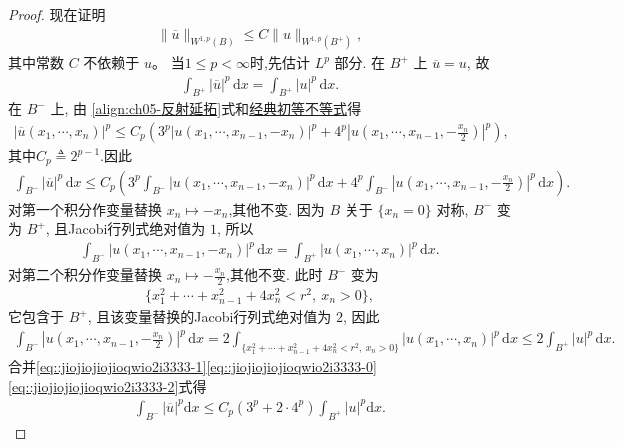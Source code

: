 \documentclass[../../main.tex]{subfiles}
\begin{document}
\begin{proof}
现在证明
\begin{align*}
\|\overline{u}\|_{W^{1,p}(B)}\leqslant C\|u\|_{W^{1,p}(B^{+})},
\end{align*}
其中常数 $C$ 不依赖于 $u$。
当$1\leqslant p<\infty$时,先估计 \(L^p\) 部分. 在 \(B^+\) 上 \(\overline{u}=u\), 故
\begin{align*}
\int_{B^+}|\overline{u}|^p\,\mathrm{d}x=\int_{B^+}|u|^p\,\mathrm{d}x.
\end{align*}
在 \(B^-\) 上, 由 \eqref{align:ch05-反射延拓}式和\hyperref[Basis of Analytics-proposition:经典初等不等式]{经典初等不等式}得
\begin{align*}
|\overline{u}(x_1,\cdots,x_n)|^p
\leqslant C_p\left(3^p|u(x_1,\cdots,x_{n-1},-x_n)|^p
+4^p\left|u\left(x_1,\cdots,x_{n-1},-\frac{x_n}{2}\right)\right|^p\right),
\end{align*}
其中$C_p\triangleq 2^{p-1}$.因此
\begin{align}\label{eq::jiojiojiojioqwio2i3333-1}
\int_{B^-}|\overline{u}|^p\,\mathrm{d}x
\leqslant C_p\left(3^p\int_{B^-}|u(x_1,\cdots,x_{n-1},-x_n)|^p\,\mathrm{d}x
+4^p\int_{B^-}\left|u\left(x_1,\cdots,x_{n-1},-\frac{x_n}{2}\right)\right|^p\,\mathrm{d}x\right).
\end{align}
对第一个积分作变量替换 \(x_n\mapsto -x_n\),其他不变. 因为 \(B\) 关于 \(\{x_n=0\}\) 对称, \(B^-\) 变为 \(B^+\), 且Jacobi行列式绝对值为 \(1\), 所以
\begin{align}\label{eq::jiojiojiojioqwio2i3333-0}
\int_{B^-}|u(x_1,\cdots,x_{n-1},-x_n)|^p\,\mathrm{d}x
=\int_{B^+}|u(x_1,\cdots,x_n)|^p\,\mathrm{d}x.
\end{align}
对第二个积分作变量替换 \(x_n\mapsto -\frac{x_n}{2}\),其他不变. 此时 \(B^-\) 变为
\begin{align*}
\{x_1^2+\cdots+x_{n-1}^2+4x_n^2<r^2,\ x_n>0\},
\end{align*}
它包含于 \(B^+\), 且该变量替换的Jacobi行列式绝对值为 \(2\), 因此
\begin{align}\label{eq::jiojiojiojioqwio2i3333-2}
\int_{B^-}\left|u\left(x_1,\cdots,x_{n-1},-\frac{x_n}{2}\right)\right|^p\,\mathrm{d}x
=2\int_{\{x_1^2+\cdots+x_{n-1}^2+4x_n^2<r^2,\ x_n>0\}}|u(x_1,\cdots,x_n)|^p\,\mathrm{d}x
\leqslant 2\int_{B^+}|u|^p\,\mathrm{d}x.
\end{align}
合并\eqref{eq::jiojiojiojioqwio2i3333-1}\eqref{eq::jiojiojiojioqwio2i3333-0}\eqref{eq::jiojiojiojioqwio2i3333-2}式得
\begin{align*}
\int_{B^-}{\left| \overline{u} \right|^p\mathrm{d}x}\leqslant C_p\left( 3^p+2\cdot 4^p \right) \int_{B^+}{\left| u \right|^p\mathrm{d}x}.

\end{align*}
\end{proof}
\end{document}
